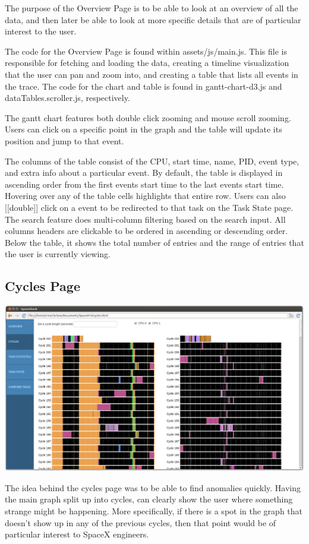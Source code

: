 \documentclass{hmcclinic}
\begin{document}
The purpose of the Overview Page is to be able to look at an overview of all the data, and then later be able to look at more specific details that are of particular interest to the user.

    The code for the Overview Page is found within assets/js/main.js. This file is
    responsible for fetching and loading the data, creating a timeline
    visualization that the user can pan and zoom into, and creating a table that
    lists all events in the trace. The code for the chart and table is found in
    gantt-chart-d3.js and dataTables.scroller.js, respectively.

    The gantt chart features both double click zooming and mouse scroll zooming. Users can click on a specific point in the graph and the table will update its position and jump to that event. 

    The columns of the table consist of the CPU, start time, name, PID, event type, and extra info about a particular event. By default, the table is displayed in ascending order from the first events start time to the last events start time. Hovering over any of the table cells highlights that entire row. Users can also [[double]] click on a event to be redirected to that task on the Task State page. The search feature does multi-column filtering based on the search input. All columns headers are clickable to be ordered in ascending or descending order. Below the table, it shows the total number of entries and the range of entries that the user is currently viewing.
  \subsection{Cycles Page} %

  \includegraphics[scale=0.25]{cycles-page.png}
  
The idea behind the cycles page was to be able to find anomalies quickly. Having the main graph split up into cycles, can clearly show the user where something strange might be happening. More specifically, if there is a spot in the graph that doesn't show up in any of the previous cycles, then that point would be of particular interest to SpaceX engineers.
\end{document}
